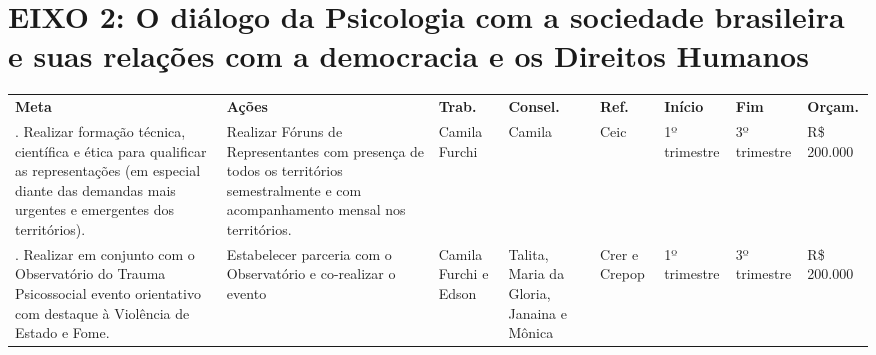 \documentclass[%
    oneside,
    a4paper,
    landscape,
    8pt
]{memoir}
\begin{document}
\chapter{EIXO 2: O diálogo da Psicologia com a sociedade brasileira e
  suas relações com a democracia e os Direitos Humanos}

\begin{longtable}[]{@{}
  >{\centering\arraybackslash}p{}
  >{\centering\arraybackslash}p{}
  >{\centering\arraybackslash}p{}
  >{\centering\arraybackslash}p{}
  >{\centering\arraybackslash}p{}
  >{\centering\arraybackslash}p{}
  >{\centering\arraybackslash}p{}
  >{\centering\arraybackslash}p{}@{}}
  \toprule\noalign{}
  \endhead
  \bottomrule\noalign{}
  \endlastfoot
  \textbf{Meta}                                                  & \textbf{Ações}                                          & \textbf{Trab.}  & \textbf{Consel.}     &
  \textbf{Ref.}                                                  & \textbf{Início}                                         & \textbf{Fim}    & \textbf{Orçam.}                        \\
  1. Realizar formação técnica, científica e ética para qualificar as
  representações (em especial diante das demandas mais urgentes e
  emergentes dos territórios).                                   & Realizar Fóruns de Representantes com
  presença de todos os territórios semestralmente e com acompanhamento
  mensal nos territórios.                                        & Camila Furchi                                           & Camila          & Ceic                 & 1º trimestre  &
  3º trimestre                                                   & R\$ 200.000                                                                                                        \\
  2. Realizar em conjunto com o Observatório do Trauma Psicossocial evento
  orientativo com destaque à Violência de Estado e Fome.         & Estabelecer
  parceria com o Observatório e co-realizar o evento             & Camila Furchi e
  Edson                                                          & Talita, Maria da Gloria, Janaina e Mônica               & Crer e Crepop   & 1º
  trimestre                                                      & 3º trimestre                                            & R\$ 200.000                                              \\

\end{longtable}
\end{document}
